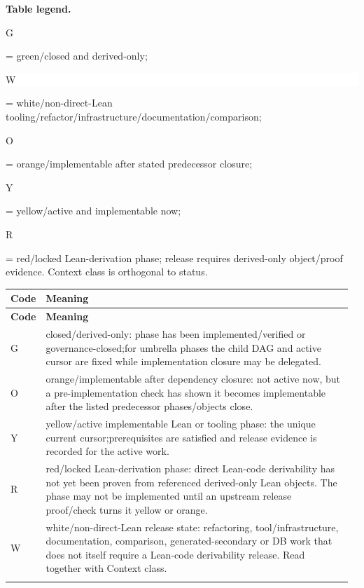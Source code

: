 \small
\par\smallskip\noindent\begin{minipage}{0.99\linewidth}\footnotesize\raggedright\textbf{Table legend.} \colorbox{green!18}{\strut G} = green/closed and derived-only; \colorbox{white}{\strut W} = white/non-direct-Lean tooling/refactor/infrastructure/documentation/comparison; \colorbox{orange!28}{\strut O} = orange/implementable after stated predecessor closure; \colorbox{yellow!25}{\strut Y} = yellow/active and implementable now; \colorbox{red!20}{\strut R} = red/locked Lean-derivation phase; release requires derived-only object/proof evidence. Context class is orthogonal to status.\end{minipage}\par\vspace{0.25em}
\begin{longtable}{L{0.045\linewidth} L{0.925\linewidth}}
\hline
\textbf{Code} & \textbf{Meaning}\\
\hline
\endfirsthead
\hline
\textbf{Code} & \textbf{Meaning}\\
\hline
\endhead
{}G & closed/\allowbreak{}derived-only: phase has been implemented/\allowbreak{}verified or governance-closed;\newline for umbrella phases the child DAG and active cursor are fixed while implementation closure may be delegated.\\
\hline
\addlinespace[0.24em]
O & orange/\allowbreak{}implementable after dependency closure: not active now, but a pre-implementation check has shown it becomes implementable after the listed predecessor phases/\allowbreak{}objects close.\\
\hline
\addlinespace[0.24em]
Y & yellow/\allowbreak{}active implementable Lean or tooling phase: the unique current cursor;\newline prerequisites are satisfied and release evidence is recorded for the active work.\\
\hline
\addlinespace[0.24em]
R & red/\allowbreak{}locked Lean-derivation phase: direct Lean-code derivability has not yet been proven from referenced derived-only Lean objects. The phase may not be implemented until an upstream release proof/\allowbreak{}check turns it yellow or orange.\\
\hline
\addlinespace[0.24em]
W & white/\allowbreak{}non-direct-Lean release state: refactoring, tool/\allowbreak{}infrastructure, documentation, comparison, generated-secondary or DB work that does not itself require a Lean-code derivability release. Read together with Context class.\\
\hline
\addlinespace[0.24em]
\end{longtable}
\normalsize
